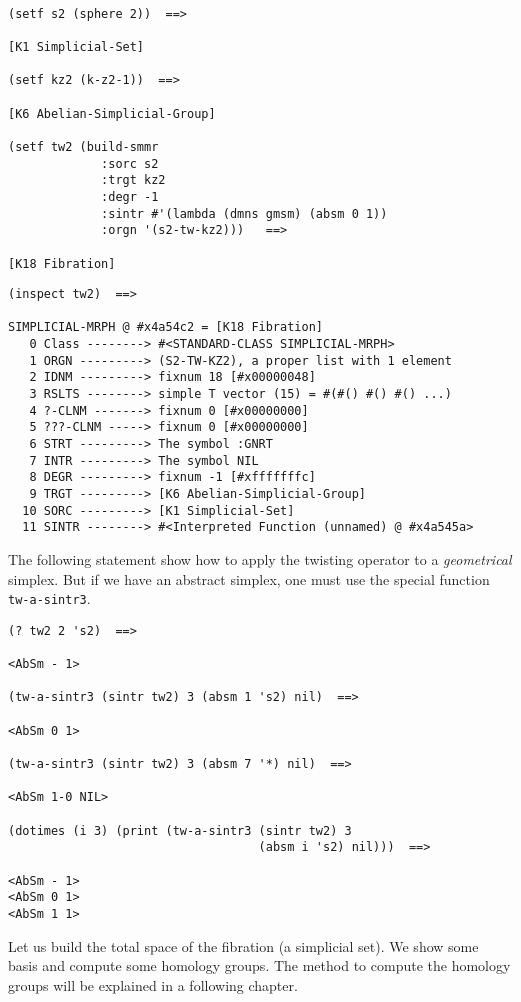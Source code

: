 {\footnotesize\begin{verbatim}

(setf s2 (sphere 2))  ==>

[K1 Simplicial-Set]

(setf kz2 (k-z2-1))  ==>

[K6 Abelian-Simplicial-Group]

(setf tw2 (build-smmr
             :sorc s2
             :trgt kz2
             :degr -1
             :sintr #'(lambda (dmns gmsm) (absm 0 1))
             :orgn '(s2-tw-kz2)))   ==>

[K18 Fibration]
\end{verbatim}}
\newpage
{\footnotesize\begin{verbatim}
(inspect tw2)  ==>

SIMPLICIAL-MRPH @ #x4a54c2 = [K18 Fibration]
   0 Class --------> #<STANDARD-CLASS SIMPLICIAL-MRPH>
   1 ORGN ---------> (S2-TW-KZ2), a proper list with 1 element
   2 IDNM ---------> fixnum 18 [#x00000048]
   3 RSLTS --------> simple T vector (15) = #(#() #() #() ...)
   4 ?-CLNM -------> fixnum 0 [#x00000000]
   5 ???-CLNM -----> fixnum 0 [#x00000000]
   6 STRT ---------> The symbol :GNRT
   7 INTR ---------> The symbol NIL
   8 DEGR ---------> fixnum -1 [#xfffffffc]
   9 TRGT ---------> [K6 Abelian-Simplicial-Group]
  10 SORC ---------> [K1 Simplicial-Set]
  11 SINTR --------> #<Interpreted Function (unnamed) @ #x4a545a>
\end{verbatim}}
The following statement show how to apply the twisting operator to a
{\em geometrical} simplex. But if we have an abstract simplex, one must
use the special function {\tt tw-a-sintr3}.
{\footnotesize\begin{verbatim}
(? tw2 2 's2)  ==>

<AbSm - 1>

(tw-a-sintr3 (sintr tw2) 3 (absm 1 's2) nil)  ==>

<AbSm 0 1>

(tw-a-sintr3 (sintr tw2) 3 (absm 7 '*) nil)  ==>

<AbSm 1-0 NIL>

(dotimes (i 3) (print (tw-a-sintr3 (sintr tw2) 3
                                   (absm i 's2) nil)))  ==>

<AbSm - 1>
<AbSm 0 1>
<AbSm 1 1>
\end{verbatim}}
Let us build the total space of the fibration (a simplicial set). We show some basis and compute
some homology groups. The method to compute the homology groups will be explained in a following
chapter.

